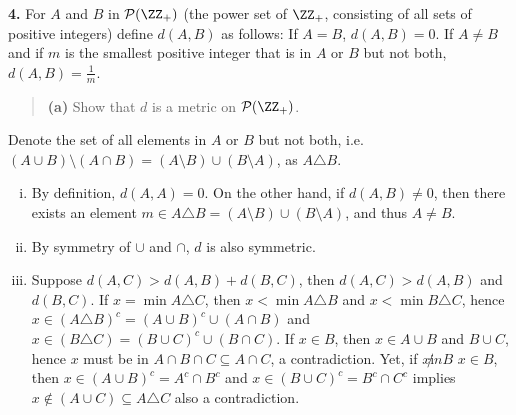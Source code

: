 \documentclass{homework}
\author{Kevin Joyce}
\begin{document}
 
\newcommand{\figref}[1]{\figurename~\ref{#1}}
\renewcommand{\bar}{\overline}
\renewcommand{\hat}{\widehat}
\renewcommand{\SS}{\mathcal S}
\newcommand{\eps}{\varepsilon}
\newcommand{\TTheta}{\overline{\underline \Theta} }
\newcommand{\del}{\partial}
\newcommand{\approxsim}{\overset{\cdotp}{\underset{\cdotp}{\sim}}}
\newcommand{\FF}{\mathcal F}
\renewcommand{\Re}{\mathrm{Re}\,}
\renewcommand{\Im}{\mathrm{Im}\,}
\newcommand{\HH}{\mathcal H}
\nocite{*}

{\bf 4.} For $A$ and $B$ in $\mathcal P(\ZZ_+)$ (the power set of $\ZZ_+$, consisting of all sets of positive integers) define $d(A,B)$ as follows: If $A=B$, $d(A,B) = 0$.  If $A\not=B$ and if $m$ is the smallest positive integer that is in $A$ or $B$ but not both, $d(A,B) = \frac 1m$.
\begin{quote}
  {\bf (a)} Show that $d$ is a metric on $\mathcal P(\ZZ_+)$.
\end{quote}
\begin{solution}
Denote the set of all elements in $A$ or $B$ but not both, i.e. $(A\cup B)\setminus(A\cap B) = (A\setminus B)\cup (B\setminus A)$, as $A\triangle B$.
\begin{enumerate}[i)]
  \item By definition, $d(A,A) = 0$.  On the other hand, if $d(A,B) \not=0$, then there exists an element $m \in A\triangle B = (A\setminus B)\cup (B\setminus A)$, and thus $A\not=B$.
  \item By symmetry of $\cup$ and $\cap$, $d$ is also symmetric.
  \item Suppose $d(A,C) > d(A,B) + d(B,C)$, then $d(A,C) > d(A,B)$ and $d(B,C)$. If $x = \min A\triangle C$, then $x < \min A \triangle B$ and $x < \min B \triangle C$, hence $x \in (A\triangle B)^c= (A\cup B)^c \cup (A\cap B)$ and $x \in (B\triangle C) = (B\cup C)^c \cup (B\cap C)$.  If $x \in B$, then $x\in A\cup B$ and $B\cup C$, hence $x$ must be in $A\cap B\cap C \subseteq A\cap C$, a contradiction.  Yet, if $x\not in B$ $x \in B$, then $x \in (A\cup B)^c = A^c \cap B^c$ and $x \in (B \cup C)^c = B^c \cap C^c$ implies $x \not\in (A\cup C) \subseteq A\triangle C$ also a contradiction.
\end{enumerate}
\end{solution}
\end{document}
